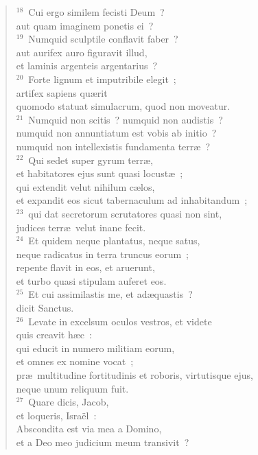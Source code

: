 \begin{flushleft}\begin{verse}${}^{18}$~Cui ergo similem fecisti Deum~?\\ aut quam imaginem ponetis ei~?\\
${}^{19}$~Numquid sculptile conflavit faber~?\\ aut aurifex auro figuravit illud,\\ et laminis argenteis argentarius~?\\
${}^{20}$~Forte lignum et imputribile elegit~;\\ artifex sapiens qu\ae rit\\ quomodo statuat simulacrum, quod non moveatur.\\
${}^{21}$~Numquid non scitis~? numquid non audistis~?\\ numquid non annuntiatum est vobis ab initio~?\\ numquid non intellexistis fundamenta terr\ae~?\\
${}^{22}$~Qui sedet super gyrum terr\ae ,\\ et habitatores ejus sunt quasi locust\ae~;\\ qui extendit velut nihilum c\ae los,\\ et expandit eos sicut tabernaculum ad inhabitandum~;\\
${}^{23}$~qui dat secretorum scrutatores quasi non sint,\\ judices terr\ae\ velut inane fecit.\\
${}^{24}$~Et quidem neque plantatus, neque satus,\\ neque radicatus in terra truncus eorum~;\\ repente flavit in eos, et aruerunt,\\ et turbo quasi stipulam auferet eos.\\
${}^{25}$~Et cui assimilastis me, et ad\ae quastis~?\\ dicit Sanctus.\\
${}^{26}$~Levate in excelsum oculos vestros, et videte\\ quis creavit h\ae c~:\\ qui educit in numero militiam eorum,\\ et omnes ex nomine vocat~;\\ pr\ae\ multitudine fortitudinis et roboris, virtutisque ejus,\\ neque unum reliquum fuit.\\
${}^{27}$~Quare dicis, Jacob,\\ et loqueris, Isra\"el~:\\ Abscondita est via mea a Domino,\\ et a Deo meo judicium meum transivit~?\\

\end{verse}
\end{flushleft}
